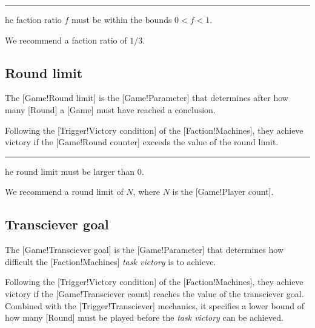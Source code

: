 \begin{rules}
    \rule{game.parameter.factionratio} The faction ratio \(f\) must be within the bounds \(0 < f < 1\).
\end{rules}

\begin{recommendations}
    \recommendation{} We recommend a faction ratio of \(1/3\).
\end{recommendations}

\subsection{Round limit}

The [Game!Round limit] is the [Game!Parameter] that determines after how many [Round] a [Game] must have reached a conclusion.

Following the [Trigger!Victory condition] of the [Faction!Machines], they achieve victory if the [Game!Round counter] exceeds the value of the round limit.

\begin{rules}
    \rule{game.parameter.roundlimit} The round limit must be larger than \(0\).
\end{rules}

\begin{recommendations}
    \recommendation{} We recommend a round limit of \(N\), where \(N\) is the [Game!Player count].
\end{recommendations}

\subsection{Transciever goal}

The [Game!Transciever goal] is the [Game!Parameter] that determines how difficult the [Faction!Machines] \emph{task victory} is to achieve.

Following the [Trigger!Victory condition] of the [Faction!Machines], they achieve victory if the [Game!Transciever count] reaches the value of the transciever goal.
Combined with the [Trigger!Transciever] mechanics, it specifies a lower bound of how many [Round] must be played before the \emph{task victory} can be achieved.

